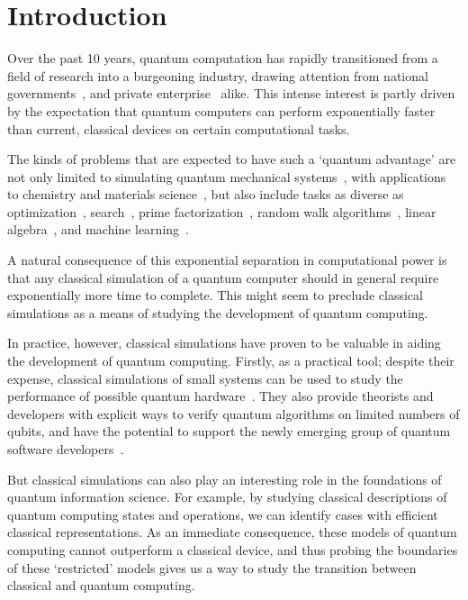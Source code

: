 
\chapter{Introduction}\label{chap:introduction}
Over the past 10 years, quantum computation has rapidly transitioned from a field of research into a burgeoning industry, drawing attention from national governments~\cite{UKNQTP,QuantumFlagship}, and private enterprise~\cite{IBMQ,GoogleQuantum,MicrosoftQuantum} alike. This intense interest is partly driven by the expectation that quantum computers can perform exponentially faster than current, classical devices on certain computational tasks.\par
The kinds of problems that are expected to have such a `quantum advantage' are not only limited to simulating quantum mechanical systems~\cite{Lloyd1996}, with applications to chemistry and materials science~\cite{Brown2010}, but also include tasks as diverse as optimization~\cite{Moll2018}, search~\cite{Grover1996}, prime factorization~\cite{Shor1994}, random walk algorithms~\cite{Kendon2006}, linear algebra~\cite{Harrow2009}, and machine learning~\cite{Biamonte2017}.\par
A natural consequence of this exponential separation in computational power is that any classical simulation of a quantum computer should in general require exponentially more time to complete. This might seem to preclude classical simulations as a means of studying the development of quantum computing.\par
In practice, however, classical simulations have proven to be valuable in aiding the development of quantum computing. Firstly, as a practical tool; despite their expense, classical simulations of small systems can be used to study the performance of possible quantum hardware~\cite{Cai2019}. They also provide theorists and developers with explicit ways to verify quantum algorithms on limited numbers of qubits, and have the potential to support the newly emerging group of quantum software developers~\cite{Qiskit,MicrosoftQDK,CircAnnouncement}.\par
But classical simulations can also play an interesting role in the foundations of quantum information science. For example, by studying classical descriptions of quantum computing states and operations, we can identify cases with efficient classical representations. As an immediate consequence, these models of quantum computing cannot outperform a classical device, and thus probing the boundaries of these `restricted' models gives us a way to study the transition between classical and quantum computing.\par
